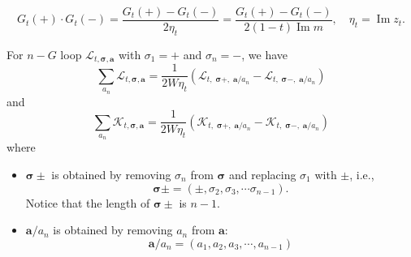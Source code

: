 \documentclass[10pt,a4paper]{amsart}
\DeclareMathOperator{\im}{{\mathrm{Im}}}
\newcommand{\cal}{\mathcal}
\begin{document}
\begin{equation}
    \label{WI_2G}
G_t(+)\cdot G_t(-)= \frac{G_t(+)-G_t(-)}{2\eta_t}=\frac{G_t(+)-G_t(-)}{ 2 (1-t)\im m},\quad \eta_t=\im z_t.
\end{equation}

\begin{lemma}\label{lem_WI_K} For $n-G$ loop ${\cal L}_{t, \boldsymbol{\sigma}, \textbf{a}}$ with 
$\sigma_1=+$ and $\sigma_n=-$, 
we have
\begin{equation}\label{WI_calL}
  \sum_{a_n}{\cal L}_{t, \boldsymbol{\sigma}, \textbf{a}}=
\frac{1}{2W\eta_t}\left({\cal L}_{t, \; \boldsymbol{\sigma}+,  \; \textbf{a}/a_n}- {\cal L}_{t, \; \boldsymbol{\sigma}-,  \; \textbf{a}/a_n}\right)  
\end{equation}
and
\begin{equation}\label{WI_calK}
  \sum_{a_n}{\cal K}_{t, \boldsymbol{\sigma}, \textbf{a}}=
\frac{1}{2W\eta_t}\left({\cal K}_{t, \; \boldsymbol{\sigma}+,  \; \textbf{a}/a_n}
- {\cal K}_{t, \; \boldsymbol{\sigma}-,  \; \textbf{a}/a_n}\right)  
\end{equation}
where 
\begin{itemize}
\item  $\boldsymbol{\sigma}\pm$ is obtained by removing $\sigma_n$ from $\boldsymbol{\sigma}$ and replacing $\sigma_1$ with $\pm$, i.e., 
    $$
\boldsymbol{\sigma}\pm=(\pm, \sigma_2, \sigma_3,\cdots \sigma_{ n-1}).$$
Notice that  the length of $\boldsymbol{\sigma}\pm$ is $n-1$. 
\item  $\textbf{a}/a_n$ is obtained by removing $a_n$ from $\textbf{a}$:
 $$
\textbf{a}/a_n=(a_1, a_2,a_3,\cdots, a_{n-1})
$$
\end{itemize}
\end{lemma}
\end{document}
